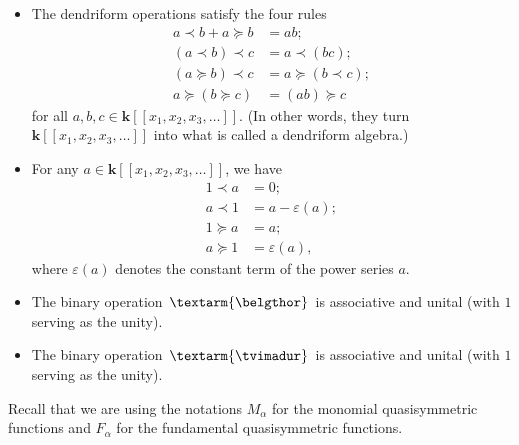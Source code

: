 \documentclass[numbers=enddot,12pt,final,onecolumn,notitlepage]{scrartcl}%
\theoremstyle{definition}
\newcommand{\tvi}{\left. \textarm{\tvimadur} \right.}
\newcommand{\bel}{\left. \textarm{\belgthor} \right.}
\begin{document}
\begin{itemize}
\item The dendriform operations satisfy the four rules
\begin{align}
a\left.  \prec\right.  b+a\left.  \succeq\right.  b  &
=ab;\label{eq.dendriform.1}\\
\left(  a\left.  \prec\right.  b\right)  \left.  \prec\right.  c  &  =a\left.
\prec\right.  \left(  bc\right)  ;\nonumber\\
\left(  a\left.  \succeq\right.  b\right)  \left.  \prec\right.  c  &
=a\left.  \succeq\right.  \left(  b\left.  \prec\right.  c\right)
;\nonumber\\
a\left.  \succeq\right.  \left(  b\left.  \succeq\right.  c\right)   &
=\left(  ab\right)  \left.  \succeq\right.  c\nonumber
\end{align}
for all $a,b,c\in\mathbf{k}\left[  \left[  x_{1},x_{2},x_{3},\ldots\right]
\right]  $. (In other words, they turn $\mathbf{k}\left[  \left[  x_{1}%
,x_{2},x_{3},\ldots\right]  \right]  $ into what is called a dendriform algebra.)

\item For any $a\in\mathbf{k}\left[  \left[  x_{1},x_{2},x_{3},\ldots\right]
\right]  $, we have%
\begin{align}
1\left.  \prec\right.  a  &  =0;\label{eq.dendriform.1<a}\\
a\left.  \prec\right.  1  &  =a-\varepsilon\left(  a\right)
;\label{eq.dendriform.a<1}\\
1\left.  \succeq\right.  a  &  =a;\label{eq.dendriform.1>=a}\\
a\left.  \succeq\right.  1  &  =\varepsilon\left(  a\right)  ,
\label{eq.dendriform.a>=1}%
\end{align}
where $\varepsilon\left(  a\right)  $ denotes the constant term of the power
series $a$.

\item The binary operation $\bel$ is associative and unital (with $1$ serving
as the unity).

\item The binary operation $\tvi$ is associative and unital (with $1$ serving
as the unity).
\end{itemize}

Recall that we are using the notations $M_{\alpha}$ for the monomial
quasisymmetric functions and $F_{\alpha}$ for the fundamental quasisymmetric functions.
\end{document}
